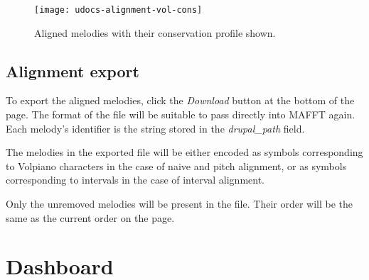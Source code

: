 \begin{figure}[!h]
\centering
\texttt{[image: udocs-alignment-vol-cons]}
\caption{Aligned melodies with their conservation profile shown.}
\label{fig:align-cons}
\end{figure}

\subsection{Alignment export}

To export the aligned melodies, click the \emph{Download} button at the bottom of the page. The format of the file will be suitable to pass directly into MAFFT again. Each melody's
identifier is the string stored in the \emph{drupal\_path} field.

The melodies in the exported file will be either encoded as symbols corresponding to Volpiano characters in the case of naive and pitch alignment, or as symbols corresponding to intervals
in the case of interval alignment.

Only the unremoved melodies will be present in the file. Their order will be the same as the current order on the page.

\section{Dashboard}